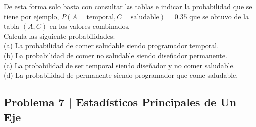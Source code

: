 \documentclass{article}
\begin{document}
De esta forma solo basta con consultar las tablas e indicar la probabilidad que se tiene por ejemplo, $P(A=\text{temporal},C=\text{saludable}) = 0.35$ que se obtuvo de la tabla $(A, C)$ en los valores combinados.
\\[12pt]
Calcula las siguiente probabilidades:
\\[12pt]
(a) La probabilidad de comer saludable siendo programador temporal.
\\[6pt]
(b) La probabilidad de comer no saludable siendo diseñador permanente.
\\[6pt]
(c) La probabilidad de ser temporal siendo diseñador y no comer saludable.
\\[6pt]
(d) La probabilidad de permanente siendo programador que come saludable.

\clearpage

\subsection*{Problema 7 | Estadísticos Principales de Un Eje}
\end{document}
